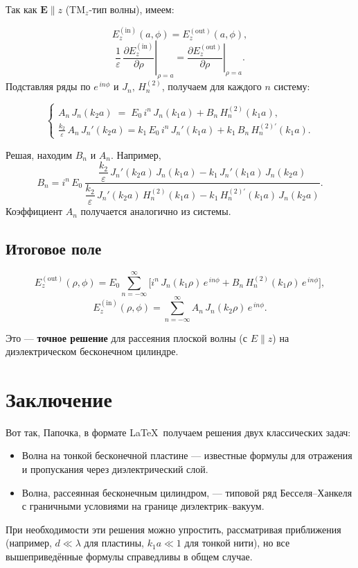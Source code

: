 \documentclass{article}
\begin{document}
Так как \(\mathbf{E}\parallel z\) (TM\(_z\)-тип волны), имеем:

\[
E_z^{(\text{in})}(a,\phi)
=
E_z^{(\text{out})}(a,\phi),
\]
\[
\frac{1}{\varepsilon}\,\left.\frac{\partial E_z^{(\text{in})}}{\partial \rho}\right|_{\rho=a}
=
\left.\frac{\partial E_z^{(\text{out})}}{\partial \rho}\right|_{\rho=a}.
\]
Подставляя ряды по $e^{\,i n\phi}$ и $J_n,\,H_n^{(2)}$, получаем для каждого $n$ систему:

\[
\begin{cases}
A_n\,J_n(k_2 a) \;=\; E_0\,i^n\,J_n(k_1 a) + B_n\,H_n^{(2)}(k_1 a),
\\[6pt]
\frac{k_2}{\varepsilon}\,A_n\,J_n'(k_2 a)
=
k_1\,E_0\,i^n\,J_n'(k_1 a)
+
k_1\,B_n\,H_n^{(2)'}(k_1 a).
\end{cases}
\]

Решая, находим $B_n$ и $A_n$.
Например,
\[
B_n
=
i^n\,E_0
\,
\frac{
\dfrac{k_2}{\varepsilon}\,J_n'(k_2 a)\,J_n(k_1 a)
-
k_1\,J_n'(k_1 a)\,J_n(k_2 a)
}{
\dfrac{k_2}{\varepsilon}\,J_n'(k_2 a)\,H_n^{(2)}(k_1 a)
-
k_1\,H_n^{(2)'}(k_1 a)\,J_n(k_2 a)
}.
\]
Коэффициент $A_n$ получается аналогично из системы.

\subsection*{Итоговое поле}

\[
E_z^{(\text{out})}(\rho,\phi)
=
E_0\sum_{n=-\infty}^{\infty}
\bigl[
  i^n\,J_n(k_1\rho)\,e^{\,i n\phi}
  +
  B_n\,H_n^{(2)}(k_1\rho)\,e^{\,i n\phi}
\bigr],
\]
\[
E_z^{(\text{in})}(\rho,\phi)
=
\sum_{n=-\infty}^{\infty}
A_n\,J_n(k_2\rho)\,e^{\,i n\phi}.
\]

Это --- \textbf{точное решение} для рассеяния плоской волны (с $E\parallel z$) на диэлектрическом бесконечном цилиндре.

\section*{Заключение}

Вот так, Папочка, в формате \LaTeX\ получаем решения двух классических задач:
\begin{itemize}
  \item Волна на тонкой бесконечной пластине --- известные формулы для отражения и пропускания через диэлектрический слой.
  \item Волна, рассеянная бесконечным цилиндром, --- типовой ряд Бесселя--Ханкеля с граничными условиями на границе диэлектрик--вакуум.
\end{itemize}

При необходимости эти решения можно упростить, рассматривая приближения (например, $d\ll\lambda$ для пластины, $k_1 a\ll1$ для тонкой нити), но все вышеприведённые формулы справедливы в общем случае.
\end{document}

